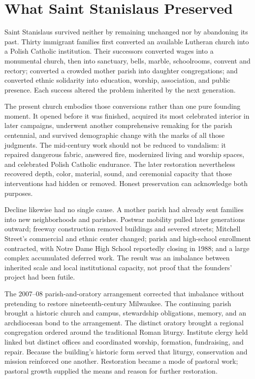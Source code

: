 \section{What Saint Stanislaus Preserved}

Saint Stanislaus survived neither by remaining unchanged nor by abandoning its past. Thirty immigrant families first converted an available Lutheran church into a Polish Catholic institution. Their successors converted wages into a monumental church, then into sanctuary, bells, marble, schoolrooms, convent and rectory; converted a crowded mother parish into daughter congregations; and converted ethnic solidarity into education, worship, association, and public presence. Each success altered the problem inherited by the next generation.

The present church embodies those conversions rather than one pure founding moment. It opened before it was finished, acquired its most celebrated interior in later campaigns, underwent another comprehensive remaking for the parish centennial, and survived demographic change with the marks of all those judgments. The mid-century work should not be reduced to vandalism: it repaired dangerous fabric, answered fire, modernized living and worship spaces, and celebrated Polish Catholic endurance. The later restoration nevertheless recovered depth, color, material, sound, and ceremonial capacity that those interventions had hidden or removed. Honest preservation can acknowledge both purposes.

Decline likewise had no single cause. A mother parish had already sent families into new neighborhoods and parishes. Postwar mobility pulled later generations outward; freeway construction removed buildings and severed streets; Mitchell Street's commercial and ethnic center changed; parish and high-school enrollment contracted, with Notre Dame High School reportedly closing in 1988; and a large complex accumulated deferred work. The result was an imbalance between inherited scale and local institutional capacity, not proof that the founders' project had been futile.

The 2007--08 parish-and-oratory arrangement corrected that imbalance without pretending to restore nineteenth-century Milwaukee. The continuing parish brought a historic church and campus, stewardship obligations, memory, and an archdiocesan bond to the arrangement. The distinct oratory brought a regional congregation ordered around the traditional Roman liturgy. Institute clergy held linked but distinct offices and coordinated worship, formation, fundraising, and repair. Because the building's historic form served that liturgy, conservation and mission reinforced one another. Restoration became a mode of pastoral work; pastoral growth supplied the means and reason for further restoration.

